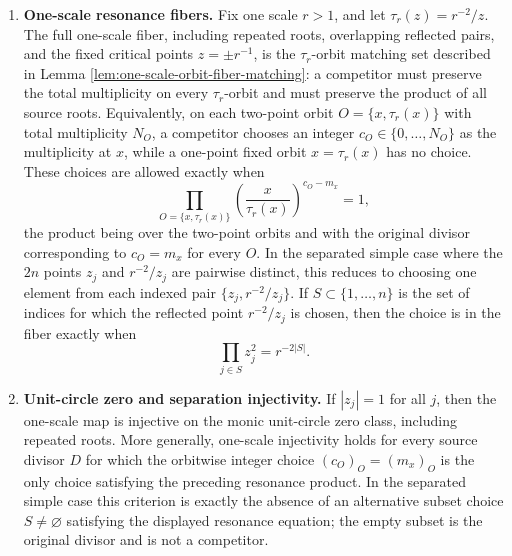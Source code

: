 \begin{theorem}
\begin{enumerate}[label=\textup{(\roman*)}]
  \item \textbf{One-scale resonance fibers.}  Fix one scale \(r>1\), and let \(\tau_r(z)=r^{-2}/z\).  The full one-scale fiber, including repeated roots, overlapping reflected pairs, and the fixed critical points \(z=\pm r^{-1}\), is the \(\tau_r\)-orbit matching set described in Lemma \ref{lem:one-scale-orbit-fiber-matching}: a competitor must preserve the total multiplicity on every \(\tau_r\)-orbit and must preserve the product of all source roots.  Equivalently, on each two-point orbit \(O=\{x,\tau_r(x)\}\) with total multiplicity \(N_O\), a competitor chooses an integer \(c_O\in\{0,\dots,N_O\}\) as the multiplicity at \(x\), while a one-point fixed orbit \(x=\tau_r(x)\) has no choice.  These choices are allowed exactly when
  \[
  \prod_{O=\{x,\tau_r(x)\}}
  \left(\frac{x}{\tau_r(x)}\right)^{c_O-m_x}=1,
  \]
  the product being over the two-point orbits and with the original divisor corresponding to \(c_O=m_x\) for every \(O\).  In the separated simple case where the \(2n\) points \(z_j\) and \(r^{-2}/z_j\) are pairwise distinct, this reduces to choosing one element from each indexed pair \(\{z_j,r^{-2}/z_j\}\).  If \(S\subset\{1,\dots,n\}\) is the set of indices for which the reflected point \(r^{-2}/z_j\) is chosen, then the choice is in the fiber exactly when
  \[
  \prod_{j\in S}z_j^2=r^{-2|S|}.
  \]

  \item \textbf{Unit-circle zero and separation injectivity.}  If \(|z_j|=1\) for all \(j\), then the one-scale map is injective on the monic unit-circle zero class, including repeated roots.  More generally, one-scale injectivity holds for every source divisor \(D\) for which the orbitwise integer choice \((c_O)_O=(m_x)_O\) is the only choice satisfying the preceding resonance product.  In the separated simple case this criterion is exactly the absence of an alternative subset choice \(S\ne\varnothing\) satisfying the displayed resonance equation; the empty subset is the original divisor and is not a competitor.
\end{enumerate}
\end{theorem}

